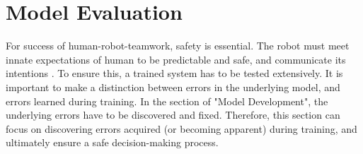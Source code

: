 \documentclass[twoside,11pt]{article}
\begin{document}


\section{Model Evaluation}
For success of human-robot-teamwork, safety is essential. The robot must meet innate expectations of human to be predictable and safe, and communicate its intentions \cite{EderHarperLeonards:2014:HITLRoboticsSafetyAssurance}. To ensure this, a trained system has to be tested extensively. It is important to make a distinction between errors in the underlying model, and errors learned during training. In the section of "Model Development", the underlying errors have to be discovered and fixed. Therefore, this section can focus on discovering errors acquired (or becoming apparent) during training, and ultimately ensure a safe decision-making process.
\end{document}
